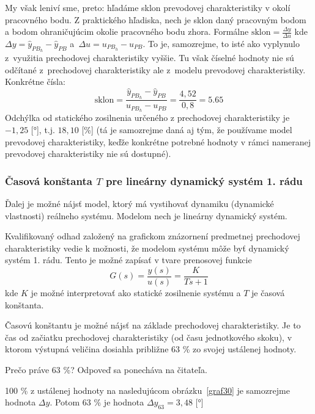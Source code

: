 \documentclass[a4paper, 10pt, ]{article}
\begin{document}
My však leniví sme, preto: hľadáme sklon prevodovej charakteristiky v okolí pracovného bodu. Z praktického hľadiska, nech je sklon daný pracovným bodom a bodom ohraničujúcim okolie pracovného bodu zhora. Formálne $\text{sklon} = \frac{\Delta y}{\Delta u}$ kde $\Delta y = \hat y_{PB_h} - \hat y_{PB}$ a~$\Delta u = u_{PB_h} - u_{PB}$. To je, samozrejme, to isté ako vyplynulo z~využitia prechodovej charakteristiky vyššie. Tu však číselné hodnoty nie sú odčítané z~prechodovej charakteristiky ale z~modelu prevodovej charakteristiky. Konkrétne čísla:
\begin{equation}
    \text{sklon} = \frac{\hat y_{PB_h} - \hat y_{PB}}{u_{PB_h} - u_{PB}} = \frac{4,52}{0,8} = 5.65
\end{equation}
Odchýlka od statického zosilnenia určeného z prechodovej charakteristiky je $-1,25$ [°], t.j. $18,10$ [\%] (tá je samozrejme daná aj tým, že používame model prevodovej charakteristiky, keďže konkrétne potrebné hodnoty v rámci nameranej prevodovej charakteristiky nie sú dostupné).




\subsubsection[Časová konštanta $T$ pre lineárny dynamický systém 1. rádu]{Časová konštanta $T$ pre lineárny dynamický systém 1. rádu}


Ďalej je možné nájsť model, ktorý má vystihovať dynamiku (dynamické vlastnosti) reálneho systému. Modelom nech je lineárny dynamický systém.

Kvalifikovaný odhad založený na grafickom znázornení predmetnej prechodovej charakteristiky vedie k možnosti, že modelom systému môže byť dynamický systém 1. rádu. Tento je možné zapísať v tvare prenosovej funkcie
\begin{equation}
    G(s) = \frac{y(s)}{u(s)} = \frac{K}{Ts+1}
\end{equation}
kde $K$ je možné interpretovať ako statické zosilnenie systému a $T$ je časová konštanta.

Časovú konštantu je možné nájsť na základe prechodovej charakteristiky. Je to čas od začiatku prechodovej charakteristiky (od času jednotkového skoku), v ktorom výstupná veličina dosiahla približne 63 \% zo svojej ustálenej hodnoty.

Prečo práve 63 \%? Odpoveď sa ponecháva na čitateľa.

100 \% z ustálenej hodnoty na nasledujúcom obrázku~\ref{graf30} je samozrejme hodnota $\Delta y$. Potom 63 \% je hodnota $\Delta y_{63} =  3,48$ [°]
\end{document}

